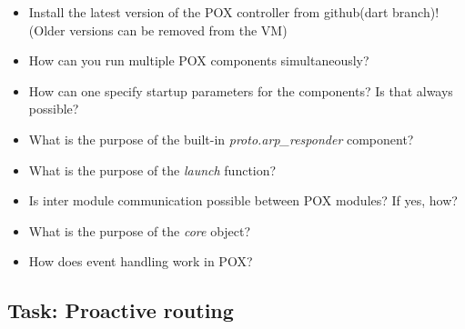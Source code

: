 \documentclass[a4paper]{article}
\begin{document}
\begin{itemize}
\item    Install the latest version of the POX controller from github(dart branch)! (Older versions can be removed from the VM)
\item    How can you run multiple POX components simultaneously?
\item    How can one specify startup parameters for the components? Is that always possible?
\item    What is the purpose of the built-in \emph{proto.arp\_responder} component? 
\item    What is the purpose of the \emph{launch} function?
\item    Is inter module communication possible between POX modules? If yes, how?
\item    What is the purpose of the \emph{core} object?
\item    How does event handling work in POX? 
\end{itemize}

\subsection{Task: Proactive routing} \label{task:ProactiveRouting}
\end{document}
